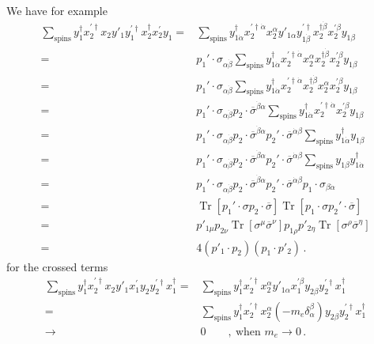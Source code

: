 We have for example
\begin{align}
\sum_{\text{spins}}y^{\dagger}_1x^{\prime\dagger}_2x_2y'_1y^{\prime\dagger}_1x_2^{\dagger} x^{\prime}_2y_1
=&  \sum_{\text{spins}}y^{\dagger}_{1\dot{\alpha}}x^{\prime\dagger\dot{\alpha}}_2x_2^{\alpha}y'_{1\alpha} y^{\prime\dagger}_{1\dot{\beta}}x_2^{\dagger\dot{\beta}} x^{\prime \beta}_2y_{1\beta} \nonumber\\
=&p_1'\cdot\sigma_{\alpha\dot{\beta}} \sum_{\text{spins}}y^{\dagger}_{1\dot{\alpha}}x^{\prime\dagger\dot{\alpha}}_2x_2^{\alpha}x_2^{\dagger\dot{\beta}} x^{\prime \beta}_2y_{1\beta} \nonumber\\
=&p_1'\cdot\sigma_{\alpha\dot{\beta}} \sum_{\text{spins}}y^{\dagger}_{1\dot{\alpha}}x^{\prime\dagger\dot{\alpha}}_2x_2^{\dagger\dot{\beta}}x_2^{\alpha} x^{\prime \beta}_2y_{1\beta} \nonumber\\
=&p_1'\cdot\sigma_{\alpha\dot{\beta}} p_2\cdot\overline{\sigma}^{\dot{\beta}\alpha} \sum_{\text{spins}}y^{\dagger}_{1\dot{\alpha}}x^{\prime\dagger\dot{\alpha}}_2 x^{\prime \beta}_2y_{1\beta} \nonumber\\
=&p_1'\cdot\sigma_{\alpha\dot{\beta}} p_2\cdot\overline{\sigma}^{\dot{\beta}\alpha} p_2'\cdot\overline{\sigma}^{\dot{\alpha}\beta}\sum_{\text{spins}}y^{\dagger}_{1\dot{\alpha}}y_{1\beta} \nonumber\\
=&p_1'\cdot\sigma_{\alpha\dot{\beta}} p_2\cdot\overline{\sigma}^{\dot{\beta}\alpha} p_2'\cdot\overline{\sigma}^{\dot{\alpha}\beta}\sum_{\text{spins}}y_{1\beta}y^{\dagger}_{1\dot{\alpha}} \nonumber\\
=&p_1'\cdot\sigma_{\alpha\dot{\beta}} p_2\cdot\overline{\sigma}^{\dot{\beta}\alpha} p_2'\cdot\overline{\sigma}^{\dot{\alpha}\beta}p_1\cdot\sigma_{\beta\dot{\alpha}} \nonumber\\
=&\operatorname{Tr}\left[ p_1'\cdot\sigma p_2\cdot\overline{\sigma}\right]\operatorname{Tr}\left[p_1\cdot\sigma p_2'\cdot\overline{\sigma}  \right] \nonumber\\
=&p'_{1\mu}p_{2\nu}\operatorname{Tr}\left[ \sigma^{\mu} \overline{\sigma}^{\nu}\right]p_{1\rho}p'_{2\eta}\operatorname{Tr}\left[\sigma^{\rho} \overline{\sigma}^{\eta}  \right] \nonumber\\
=&4\left( p'_1\cdot p_2 \right)\left(p_1\cdot p'_2  \right) \,.
\end{align}
for the crossed terms
\begin{align}
 \sum_{\text{spins}}  y^{\dagger}_1x^{\prime\dagger}_2x_2y'_1x^{\prime}_1y_2 y^{\prime\dagger}_2x_1^{\dagger}
=&\sum_{\text{spins}}  y^{\dagger}_1x^{\prime\dagger}_2x_2^{\alpha}y'_{1\alpha}x^{\prime \beta}_1y_{2\beta} y^{\prime\dagger}_2x_1^{\dagger} \nonumber\\
=&\sum_{\text{spins}}  y^{\dagger}_1x^{\prime\dagger}_2x_2^{\alpha} \left( -m_e \delta_{\alpha}^{\beta}  \right)y_{2\beta} y^{\prime\dagger}_2x_1^{\dagger} \nonumber\\
\to&0\qquad,\ \text{when $m_e\to 0$}\,. 
\end{align}
